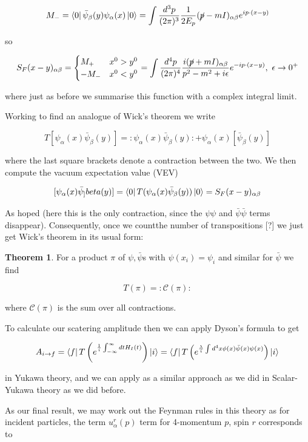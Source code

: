 \documentclass{article}
\theoremstyle{definition}
\newtheorem{theorem}{Theorem}
\begin{document}
$$ M_- = \bra{0} \bar{\psi}_\beta (y) \psi_\alpha (x) \ket{0} = \int
\frac{d^3p}{(2\pi)^3} \frac{1}{2E_p} (\cancel{p} - mI)_{\alpha \beta} e^{ip
  \cdot (x - y)} $$

so

$$ S_F(x - y)_{\alpha \beta} = 
\begin{cases}
M_+ & x^0 > y^0 \\
-M_- & x^0 < y^0
\end{cases} 
= \int \frac{d^4p}{(2\pi)^4} \frac{i(\cancel{p} + mI)_{\alpha \beta}}{p^2 - m^2
  + i \epsilon} e^{-ip \cdot (x - y)}, \ \epsilon \to 0^+ $$

where just as before we summarise this function with a complex integral limit.

Working to find an analogue of Wick's theorem we write

$$ T[\psi_\alpha(x) \bar{\psi}_\beta(y)] = : \psi_\alpha(x) \bar{\psi}_\beta(y)
: + \psi_\alpha(x) [\bar{\psi}_\beta(y)] $$

where the last square brackets denote a contraction between the two. We then
compute the vacuum expectation value (VEV)

$$ [\psi_\alpha(x) \bar{\psi}_]beta(y)] = \bra{0} T(\psi_\alpha(x)
\bar{\psi}_\beta(y)) \ket{0} = S_F(x - y)_{\alpha \beta} $$


As hoped (here this is the only contraction, since the $\psi \psi$ and
$\bar{\psi} \bar{\psi}$ terms disappear). Consequently, once we countthe number
of transpositions [?] we just get Wick's theorem in its usual form:

\begin{theorem}
For a product $\pi$ of $\psi, \bar{\psi}$s with $\psi(x_i) = \psi_i$ and similar
for $\bar{\psi}$ we find

$$ T(\pi) = :\mathcal{C}(\pi): $$

where $\mathcal{C}(\pi)$ is the sum over all contractions.
\end{theorem}

To calculate our scatering amplitude then we can apply Dyson's formula to get

$$ A_{i \to f} = \bra{f} T \left( e^{\frac{1}{i} \int_{-\infty}^\infty dt
  H_I(t)} \right) \ket{i} = \bra{f} T \left( e^{\frac{\lambda}{i} \int d^4x
    \phi(x) \bar{\psi}(x) \psi(x)} \right) \ket{i} $$

in Yukawa theory, and we can apply as a similar approach as we did in
Scalar-Yukawa theory as we did before. 

As our final result, we may work out the Feynman rules in this theory as for
incident particles, the term $u_\alpha^r(p)$ term for 4-momentum $p$, spin $r$
corresponds to
\end{document}
